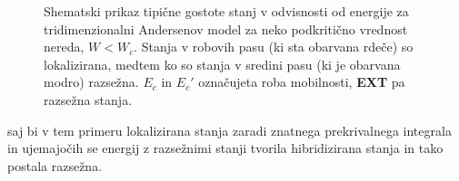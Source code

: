 \begin{minipage}[t]{0.42\textwidth} 
\begin{figure}[H]
\caption{Shematski prikaz tipične gostote stanj v odvisnosti od energije za tridimenzionalni Andersenov model za neko podkritično vrednost nereda, $W<W_c$. Stanja v robovih pasu (ki sta obarvana rdeče) so lokalizirana, medtem ko so stanja v sredini pasu (ki je obarvana modro) razsežna. $E_c$ in $E_c'$ označujeta roba mobilnosti, \textbf{EXT} pa razsežna stanja. }
\label{fig:mob_edge_DOS} 
\end{figure}
\end{minipage}
saj bi v tem primeru lokalizirana stanja zaradi znatnega prekrivalnega integrala in ujemajočih se energij z razsežnimi stanji tvorila hibridizirana stanja in tako postala razsežna.
